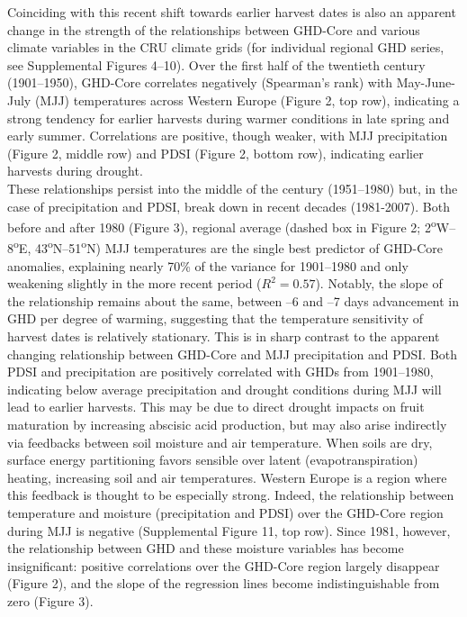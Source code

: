\documentclass[final]{nature}
\begin{document}
\indent Coinciding with this recent shift towards earlier harvest dates is also an apparent change in the strength of the relationships between GHD-Core and various climate variables in the CRU climate grids (for individual regional GHD series, see Supplemental Figures 4--10). Over the first half of the twentieth century (1901--1950), GHD-Core correlates negatively (Spearman's rank) with May-June-July (MJJ) temperatures across Western Europe (Figure 2, top row), indicating a strong tendency for earlier harvests during warmer conditions in late spring and early summer. Correlations are positive, though weaker, with MJJ precipitation (Figure 2, middle row) and PDSI (Figure 2, bottom row), indicating earlier harvests during drought.\\
\indent These relationships persist into the middle of the century (1951--1980) but, in the case of precipitation and PDSI, break down in recent decades (1981-2007). Both before and after 1980 (Figure 3), regional average (dashed box in Figure 2; 2\textsuperscript{o}W--8\textsuperscript{o}E, 43\textsuperscript{o}N--51\textsuperscript{o}N) MJJ temperatures are the single best predictor of GHD-Core anomalies, explaining nearly 70\% of the variance for 1901--1980 and only weakening slightly in the more recent period ($R^2=0.57$). Notably, the slope of the relationship remains about the same, between --6 and --7 days advancement in GHD per degree of warming, suggesting that the temperature sensitivity of harvest dates is relatively stationary. This is in sharp contrast to the apparent changing relationship between GHD-Core and MJJ precipitation and PDSI. Both PDSI and precipitation are positively correlated with GHDs from 1901--1980, indicating below average precipitation and drought conditions during MJJ will lead to earlier harvests. This may be due to direct drought impacts on fruit maturation by increasing abscisic acid production\cite{webb2012}, but may also arise indirectly via feedbacks between soil moisture and air temperature. When soils are dry, surface energy partitioning favors sensible over latent (evapotranspiration) heating, increasing soil and air temperatures. Western Europe is a region where this feedback is thought to be especially strong\cite{Seneviratne2006}. Indeed, the relationship between temperature and moisture (precipitation and PDSI) over the GHD-Core region during MJJ is negative (Supplemental Figure 11, top row). Since 1981, however, the relationship between GHD and these moisture variables has become insignificant: positive correlations over the GHD-Core region largely disappear (Figure 2), and the slope of the regression lines become indistinguishable from zero (Figure 3).\\
\end{document}

